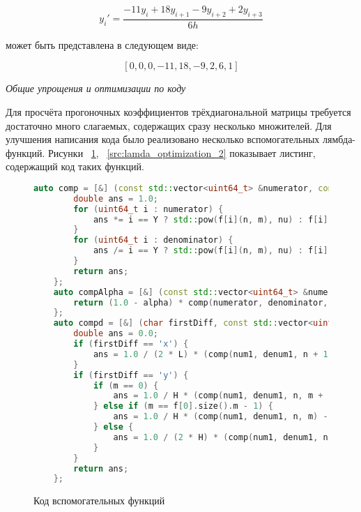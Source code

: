 \begin{equation}
    y_i' = \frac{-11y_{i} + 18y_{i+1} - 9y_{i+2} + 2y_{i+3}}{6h}
    \label{eq:Diff1-4}
\end{equation}

может быть представлена в следующем виде:

$$
[0, 0, 0, -11, 18, -9, 2, 6, 1]
$$

\textit{Общие упрощения и оптимизации по коду}

Для просчёта прогоночных коэффициентов трёхдиагональной матрицы требуется достаточно много слагаемых, содержащих сразу несколько множителей. Для улучшения написания кода было реализовано несколько вспомогательных лямбда-функций. Рисунки ~\ref{src:lamda_optimization_1}, ~\ref{src:lamda_optimization_2} показывает листинг, содержащий код таких функций.

\begin{figure}
\begin{lstlisting}[language=C++]
    auto comp = [&] (const std::vector<uint64_t> &numerator, const std::vector<uint64_t> &denominator, uint64_t n, uint64_t m) -> double {
        double ans = 1.0;
        for (uint64_t i : numerator) {
            ans *= i == Y ? std::pow(f[i](n, m), nu) : f[i](n, m);
        }
        for (uint64_t i : denominator) {
            ans /= i == Y ? std::pow(f[i](n, m), nu) : f[i](n, m);
        }
        return ans;
    };
    auto compAlpha = [&] (const std::vector<uint64_t> &numerator, const std::vector<uint64_t> &denominator, uint64_t n, uint64_t m) -> double {
        return (1.0 - alpha) * comp(numerator, denominator, n - 1, m) + alpha * comp(numerator, denominator, n, m);
    };
    auto compd = [&] (char firstDiff, const std::vector<uint64_t> &num1, const std::vector<uint64_t> &denum1, uint64_t n, uint64_t m) -> double {
        double ans = 0.0;
        if (firstDiff == 'x') {
            ans = 1.0 / (2 * L) * (comp(num1, denum1, n + 1, m) - comp(num1, denum1, n - 1, m));
        }
        if (firstDiff == 'y') {
            if (m == 0) {
                ans = 1.0 / H * (comp(num1, denum1, n, m + 1) - comp(num1, denum1, n, m));
            } else if (m == f[0].size().m - 1) {
                ans = 1.0 / H * (comp(num1, denum1, n, m) - comp(num1, denum1, n, m - 1));
            } else {
                ans = 1.0 / (2 * H) * (comp(num1, denum1, n, m + 1) - comp(num1, denum1, n, m - 1));
            }
        }
        return ans;
    };
\end{lstlisting}
\caption{Код вспомогательных функций}
\label{src:lamda_optimization_1}
\end{figure}

